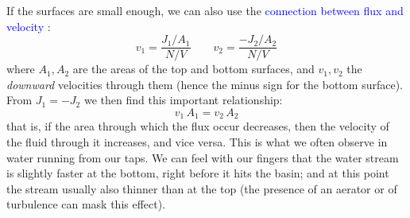 \documentclass[a4paper,12pt,%
onecolumn,oneside,%
british%
]{memoir}
\renewcommand*{\|}[1][]{\nonscript\:#1\vert\nonscript\:\mathopen{}}
\newcommand*{\sect}{\S}%
\renewcommand*{\autoref}[3][\sect\,\ref]{\textcolor{blue}{#3}
\raisebox{0.6ex}{\color{blue}\miniscule%
\faIcon{angle-right}%
\;#1{#2}\;p.\,\pageref{#2}}}
\newcommand*{\yN}{N}
\newcommand*{\yJ}{J}
\begin{document}
\medskip

If the surfaces are small enough, we can also use the \autoref{sec:fluxes_velocities}{connection between flux and velocity}:
\begin{equation*}
  v_{1} = \frac{\yJ_{1}/A_{1}}{\yN/V}
  \qquad
  v_{2} = \frac{-\yJ_{2}/A_{2}}{\yN/V}
\end{equation*}
where $A_{1}, A_{2}$ are  the areas  of the top and bottom surfaces, and $v_{1}, v_{2}$ the \emph{downward} velocities through them (hence the minus sign for the bottom surface). From $\yJ_{1} = -\yJ_{2}$ we then find this important relationship:
\begin{equation*}
  v_{1}\,A_{1} = v_{2}\,A_{2}
\end{equation*}
that is, if the area through which the flux occur decreases, then the velocity of the fluid through it increases, and vice versa. This is what we often observe in water running from our taps. We can feel with our fingers that the water stream is slightly faster at the bottom, right before it hits the basin; and at this point the stream usually also thinner than at the top (the presence of an aerator or of turbulence can mask this effect).
%
%
\end{document}
